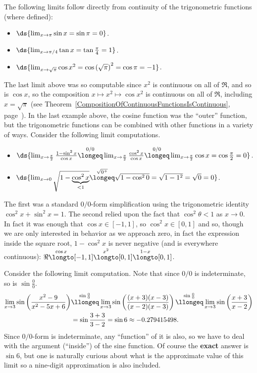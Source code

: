 \bex The following limits follow directly from continuity
of the trigonometric functions (where defined):
\begin{itemize}
\item $\ds{\lim_{x\to\pi}\sin x=\sin\pi=0}$.
\item $\ds{\lim_{x\to\pi/4}\tan x=\tan\frac{\pi}4=1}$.
\item $\ds{\lim_{x\to\sqrt{\pi}}\cos x^2=\cos\left(\sqrt\pi\right)^2
         =\cos\pi=-1}$.
\end{itemize}
The last limit above was so computable since $x^2$ is continuous 
on all of $\Re$, and so is $\cos x$, so the composition
$x\longmapsto x^2\longmapsto \cos x^2$ is continuous on all of $\Re$,
including $x=\sqrt\pi$
(see Theorem~\ref{CompositionOfContinuousFunctionsIsContinuous},
page~\pageref{CompositionOfContinuousFunctionsIsContinuous}).
\eex
In the last example above, the cosine function
was the ``outer'' function, but the trigonometric functions can 
be combined with other functions in a variety of ways.
\bex Consider the following limit computations.
\begin{itemize}
\item $\ds{\lim_{x\to\frac{\pi}2}\frac{1-\sin^2x}{\cos x}
\overset{0/0}{\longeq}\lim_{x\to\frac{\pi}2}\frac{\cos^2x}{\cos x}
\overset{0/0}{\longeq}\lim_{x\to\frac{\pi}2}\cos x=\cos\frac{\pi}2=0}$.
\item $\ds{\lim_{x\to0}\sqrt{1-\underbrace{\cos^2x}_{<1}}
\overset{\sqrt{0^+}}{\longeq}\sqrt{1-\cos^20}=\sqrt{1-1^2}
         =\sqrt0=0}$.
\end{itemize}
The first was a standard $0/0$-form simplification using the 
trigonometric identity $\cos^2x+\sin^2x=1$.  The second relied
upon the fact that $\cos^2\theta<1$ as $x\to0$.
In fact it was enough that $\cos x\in[-1,1]$, so $\cos^2x\in[0,1]$
and so, though we are only interested in behavior as we approach
zero, in fact the expression inside the square root, 
$1-\cos^2x$ is never negative (and is everywhere continuous):
$\Re\overset{\cos x}{\longto}[-1,1]\overset{x^2}{\longto}[0,1]
\overset{1-x}{\longto}[0,1]$.
\eex


\bex Consider the following limit computation.
Note that since $0/0$ is indeterminate, so is $\sin\frac00$.
\begin{align*}
\lim_{x\to3}\sin\left(\frac{x^2-9}{x^2-5x+6}\right)
&\overset{\sin\frac00}{\llongeq}
\lim_{x\to3}\sin\left(\frac{(x+3)(x-3)}{(x-2)(x-3)}\right)
\overset{\sin\frac00}{\llongeq}
\lim_{x\to3}\sin\left(\frac{x+3}{x-2}\right)\\
&
=\sin\frac{3+3}{3-2}=\sin6\approx-0.279415498.\end{align*}
Since $0/0$-form is indeterminate, any ``function'' of it 
is also, so we have to deal with the argument (``inside'')
of the sine function.  Of course the {\bf exact} answer
is $\sin6$, but one is naturally curious about what
is the approximate value of this limit so a nine-digit
approximation is also included.
\label{LimitOfSineOfSomethingUgly-I}\eex

